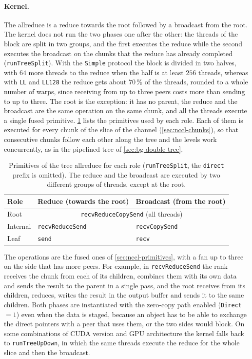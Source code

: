 \paragraph{Kernel.}
The allreduce is a reduce towards the root followed by a broadcast from the root.
The kernel does not run the two phases one after the other: the threads of the block are split in two groups, and the first executes the reduce while the second executes the broadcast on the chunks that the reduce has already completed (\texttt{runTreeSplit}).
With the \texttt{Simple} protocol the block is divided in two halves, with $64$ more threads to the reduce when the half is at least $256$ threads, whereas with \texttt{LL} and \texttt{LL128} the reduce gets about $70\,\%$ of the threads, rounded to a whole number of warps, since receiving from up to three peers costs more than sending to up to three.
The root is the exception: it has no parent, the reduce and the broadcast are the same operation on the same chunk, and all the threads execute a single fused primitive.
\cref{tab:nccl-tree-calls} lists the primitives used by each role.
Each of them is executed for every chunk of the slice of the channel (\cref{sec:nccl-chunks}), so that consecutive chunks follow each other along the tree and the levels work concurrently, as in the pipelined tree of \cref{sec:bg-double-tree}.
\begin{table}[t]
\centering
\small
\caption{Primitives of the \nccl{} tree allreduce for each role (\texttt{runTreeSplit}, the \texttt{direct} prefix is omitted). The reduce and the broadcast are executed by two different groups of threads, except at the root.}
\label{tab:nccl-tree-calls}
\begin{tabular}{@{}lll@{}}
\toprule
Role & Reduce (towards the root) & Broadcast (from the root) \\
\midrule
Root     & \multicolumn{2}{c}{\texttt{recvReduceCopySend} (all threads)} \\
Internal & \texttt{recvReduceSend}  & \texttt{recvCopySend} \\
Leaf     & \texttt{send}            & \texttt{recv} \\
\bottomrule
\end{tabular}
\end{table}
The operations are the fused ones of \cref{sec:nccl-primitives}, with a fan up to three on the side that has more peers.
For example, in \texttt{recvReduceSend} the rank receives the chunk from each of its children, combines them with its own data and sends the result to the parent in a single pass, and the root receives from its children, reduces, writes the result in the output buffer and sends it to the same children.
Both phases are instantiated with the zero-copy path enabled (\texttt{Direct}$=1$) even when the data is staged, because an object has to be able to exchange the direct pointers with a peer that uses them, or the two sides would block.
On some combinations of CUDA version and GPU architecture the kernel falls back to \texttt{runTreeUpDown}, in which the same threads execute the reduce for the whole slice and then the broadcast.
